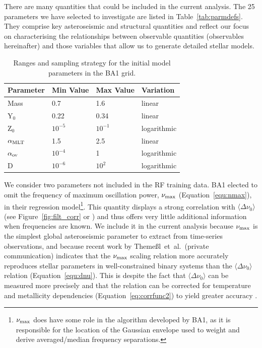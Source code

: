 There are many quantities that could be included in the current analysis. 
The 25 parameters we have selected to investigate are listed in Table~\ref{tab:parmdefs}. 
They  comprise key asteroseismic and structural quantities and reflect our focus on characterising the relationships between observable quantities (observables hereinafter) and those variables that allow us to generate detailed stellar models. 


\begin{table}
\centering
\begin{tabular}{llll}
\hline \hline
Parameter	&	Min Value	&	Max Value	&	Variation 	\\ 
\hline 
Mass	&	0.7	&	1.6	&	linear\\
Y$_0$	&	0.22	&	0.34	&	linear\\
Z$_0$	&	$10^{-5}$	&	$10^{-1}$	&	logarithmic\\
$\alpha_{\rm{MLT}}$	&	1.5	&	2.5	&	linear\\
$\alpha_{\rm{ov}}$	&	$10^{-4}$	&	1	&	logarithmic\\
D	&	$10^{-6}$	&	$10^{2}$	&	logarithmic	\\
\hline
\end{tabular}
\caption{Ranges and sampling strategy for the initial model parameters in the BA1 grid.}
\label{tab:prange}
\end{table}

We consider two parameters not included in the RF training data. 
BA1 elected to omit the frequency of maximum oscillation power, $\nu_{\rm{max}}$ (Equation~\ref{equ:nmax}), in their regression model\footnote{$\nu_{\rm{max}}$ does have some role in the algorithm developed by BA1, as it is responsible for the location of the Gaussian envelope used to weight and derive averaged/median frequency separations.}. This quantity displays a strong correlation with $\langle\Delta\nu_0\rangle$  (see Figure~\ref{fig:filt_corr}  or \citealt{2009A&A...506..465H,2009MNRAS.400L..80S}) and thus offers very little additional information when frequencies are known. 
We include it in the current analysis because $\nu_{\rm{max}}$ is the simplest global asteroseismic parameter to extract from time-series observations, and because recent work by Theme{\ss}l~et~al.~(private communication) indicates that the $\nu_{\rm{max}}$ scaling relation more accurately reproduces stellar parameters in well-constrained binary systems than the $\langle\Delta\nu_0\rangle$ relation (Equation~\ref{equ:dnu}). This is despite the fact that $\langle\Delta\nu_0\rangle$ can be measured more precisely and that the relation can be corrected for temperature and metallicity dependencies (Equation~\ref{eq:corrfunc2}) to yield greater accuracy \citep{2016MNRAS.460.4277G, 2016ApJ...822...15S}. 

